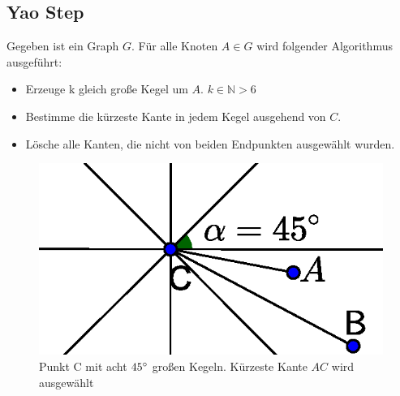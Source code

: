 \documentclass[a4paper,twoside]{IEEEtran}
\begin{document}
\subsection{Yao Step}
Gegeben ist ein Graph $G $. Für alle Knoten $A \in G $ wird folgender Algorithmus ausgeführt:
\begin{itemize}
\item Erzeuge k gleich große Kegel um $A $. $k \in \mathds{N} > 6 $
\item Bestimme die kürzeste Kante in jedem Kegel ausgehend von $C $.
\item Lösche alle Kanten, die nicht von beiden Endpunkten ausgewählt wurden.
\end{itemize}

\begin{figure}
\centering
\includegraphics[width=0.99\linewidth]{Yao_Step2.eps}
\caption{Punkt C mit acht $45\degree $ großen Kegeln. Kürzeste Kante $AC $ wird ausgewählt}
\label{fig:YaoStep2}
\end{figure}


\end{document}
